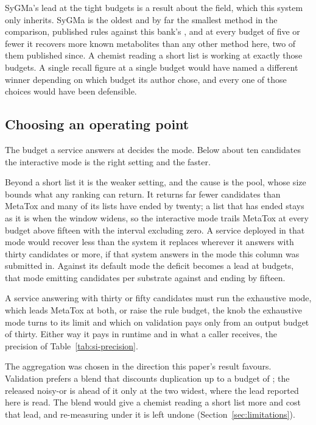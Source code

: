 SyGMa's lead at the tight budgets is a result about the field, which this system only inherits.
SyGMa is the oldest and by far the smallest method in the comparison, \numSygmaRules{} published
rules against this bank's \numBankRules{}, and at every budget of five or fewer it recovers more
known metabolites than any other method here, two of them published since. A chemist reading a
short list is working at exactly those budgets. A single recall figure at a single budget would
have named a different winner depending on which budget its author chose, and every one of those
choices would have been defensible.

\subsection{Choosing an operating point}
\label{sec:offers}

The budget a service answers at decides the mode. Below about ten candidates the interactive
mode is the right setting and the faster.

Beyond a short list it is the weaker setting, and the cause is the pool, whose size bounds what
any ranking can return. It returns far fewer candidates than MetaTox and many of its lists have
ended by twenty; a list that has ended stays as it is when the window widens, so the
interactive mode trails MetaTox at every budget above fifteen with the interval excluding zero. A service deployed in that mode would recover less than the
system it replaces wherever it answers with thirty candidates or more, if that system answers in
the mode this column was submitted in. Against its default mode the deficit becomes a lead at
\numMtmodeTrainedreversedWord{} budgets, that mode emitting \numMtmodeEmitteddefault{} candidates
per substrate against \numMtmodeEmittedsmirks{} and ending by fifteen.

A service answering with thirty or fifty candidates must run the exhaustive mode, which leads
MetaTox at both, or raise the rule budget, the knob the exhaustive mode turns to its limit and
which on validation pays only from an output budget of thirty. Either way it pays in runtime and
in what a caller receives, the precision of Table~\ref{tab:si-precision}.

The aggregation was chosen in the direction this paper's result favours. Validation prefers
a blend that discounts duplication up to a budget of \numAggvalHybridwinsmaxWord{}; the released
noisy-or is ahead of it only at the two widest, where the lead reported here is read. The blend
would give a chemist reading a short list more and cost that lead, and re-measuring under it is
left undone (Section~\ref{sec:limitations}).

